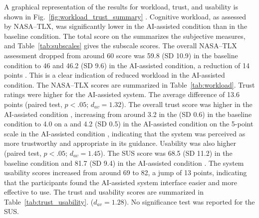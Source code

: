 \documentclass[journal]{IEEEtran}
\theoremstyle{plain}
\theoremstyle{definition}
\providecommand{\DIFaddtex}[1]{{\protect\color{blue} \sf #1}} %
\providecommand{\DIFdeltex}[1]{{\protect\color{red} \scriptsize #1}} %
\providecommand{\DIFaddbegin}{} %
\providecommand{\DIFaddend}{} %
\providecommand{\DIFdelbegin}{} %
\providecommand{\DIFdelend}{} %
\providecommand{\DIFadd}[1]{\texorpdfstring{\DIFaddtex{#1}}{#1}} %
\providecommand{\DIFdel}[1]{\texorpdfstring{\DIFdeltex{#1}}{}} %
\newcommand{\DIFscaledelfig}{0.5}
\newlength{\DIFdelgraphicswidth} %
\newlength{\DIFdelgraphicsheight} %
\newcommand{\DIFaddincludegraphics}[2][]{{\color{blue}\fbox{\DIFOincludegraphics[#1]{#2}}}} %
\newcommand{\DIFdelincludegraphics}[2][]{%
\sbox{\DIFdelgraphicsbox}{\DIFOincludegraphics[#1]{#2}}%
\settoboxwidth{\DIFdelgraphicswidth}{\DIFdelgraphicsbox} %
\settoboxtotalheight{\DIFdelgraphicsheight}{\DIFdelgraphicsbox} %
\scalebox{\DIFscaledelfig}{%
\parbox[b]{\DIFdelgraphicswidth}{\usebox{\DIFdelgraphicsbox}\\[-\baselineskip] \rule{\DIFdelgraphicswidth}{0em}}\llap{\resizebox{\DIFdelgraphicswidth}{\DIFdelgraphicsheight}{%
\setlength{\unitlength}{\DIFdelgraphicswidth}%
\begin{picture}(1,1)%
\thicklines\linethickness{2pt} %
{\color[rgb]{1,0,0}\put(0,0){\framebox(1,1){}}}%
{\color[rgb]{1,0,0}\put(0,0){\line( 1,1){1}}}%
{\color[rgb]{1,0,0}\put(0,1){\line(1,-1){1}}}%
\end{picture}%
}\hspace*{3pt}}} %
} %
\DeclareRobustCommand{\DIFaddbegin}{\DIFOaddbegin \let\includegraphics\DIFaddincludegraphics} %
\DeclareRobustCommand{\DIFaddend}{\DIFOaddend \let\includegraphics\DIFOincludegraphics} %
\DeclareRobustCommand{\DIFdelbegin}{\DIFOdelbegin \let\includegraphics\DIFdelincludegraphics} %
\DeclareRobustCommand{\DIFdelend}{\DIFOaddend \let\includegraphics\DIFOincludegraphics} %
\begin{document}
\DIFdel{A graphical representation of the results for workload, trust, and usability is shown in }\DIFdelend Fig.~\ref{fig:workload_trust_summary} \DIFdelbegin \DIFdel{.
    Cognitive workload, as assessed by NASA--TLX, was significantly lower in the AI-assisted condition than in the baseline condition.
    The total score on the }\DIFdelend \DIFaddbegin \DIFadd{summarizes the subjective measures, and Table~\ref{tab:subscales} gives the subscale scores.
    The overall }\DIFaddend NASA--TLX \DIFdelbegin \DIFdel{assessment dropped from around 60 }\DIFdelend \DIFaddbegin \DIFadd{score was 59.8 (SD 10.9) }\DIFaddend in the baseline condition \DIFdelbegin \DIFdel{to 46 }\DIFdelend \DIFaddbegin \DIFadd{and 46.2 (SD 9.6) }\DIFaddend in the AI-assisted condition, a \DIFdelbegin \DIFdel{reduction of 14 points . This is a clear indication of reduced workload in the AI-assisted condition. The NASA--TLX scores are summarized in Table~\ref{tab:workload}.
    Trust ratings were higher for the AI-assisted system.
    The average }\DIFdelend \DIFaddbegin \DIFadd{difference of 13.6 points (paired test, $p < .05$; $d_{av} = 1.32$).
    The overall }\DIFaddend trust score was \DIFdelbegin \DIFdel{higher in the AI-assisted condition , increasing from around 3.2 in the }\DIFdelend \DIFaddbegin \DIFadd{3.4 (SD 0.6) in the }\DIFaddend baseline condition \DIFdelbegin \DIFdel{to 4.0 on a }\DIFdelend \DIFaddbegin \DIFadd{and 4.2 (SD 0.5) in the AI-assisted condition on the }\DIFaddend 5-point scale \DIFdelbegin \DIFdel{in the AI-assisted condition , indicating that the system was perceived as more trustworthy and appropriate in its guidance.
    Usability was also higher }\DIFdelend \DIFaddbegin \DIFadd{(paired test, $p < .05$; $d_{av} = 1.45$).
    The SUS score was 68.5 (SD 11.2) in the baseline condition and 81.7 (SD 9.4) }\DIFaddend in the AI-assisted condition \DIFdelbegin \DIFdel{. The system usability scores increased from around 69 to 82, a jump of 13 points, indicating that the participants found the AI-assisted system interface easier and more effective to use.
The trust and usability scores are summarized in Table~\ref{tab:trust_usability}.
}\DIFdelend \DIFaddbegin \DIFadd{($d_{av} = 1.28$). No significance test was reported for the SUS.
}\DIFaddend 
\end{document}
